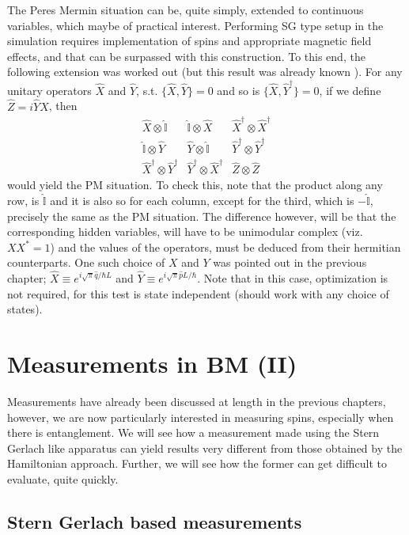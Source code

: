 The Peres Mermin situation can be, quite simply, extended to continuous
variables, which maybe of practical interest. Performing SG type setup
in the simulation requires implementation of spins and appropriate
magnetic field effects, and that can be surpassed with this construction.
To this end, the following extension was worked out (but this result
was already known \cite{contextualityPhaseSpace}). For any unitary
operators $\hat{X}$ and $\hat{Y}$, s.t. $\{\hat{X},\hat{Y}\}=0$
and so is $\{\hat{X},\hat{Y}^{\dagger}\}=0$, if we define $\hat{Z}=i\hat{Y}\hat{X}$,
then 
\[
\begin{array}{ccc}
\hat{X}\otimes\hat{\mathbb{I}} & \hat{\mathbb{I}}\otimes\hat{X} & \hat{X}^{\dagger}\otimes\hat{X}^{\dagger}\\
\hat{\mathbb{I}}\otimes\hat{Y} & \hat{Y}\otimes\hat{\mathbb{I}} & \hat{Y}^{\dagger}\otimes\hat{Y}^{\dagger}\\
\hat{X}^{\dagger}\otimes\hat{Y}^{\dagger} & \hat{Y}^{\dagger}\otimes\hat{X}^{\dagger} & \hat{Z}\otimes\hat{Z}
\end{array}
\]
would yield the PM situation. To check this, note that the product
along any row, is $\hat{\mathbb{I}}$ and it is also so for each column,
except for the third, which is $-\hat{\mathbb{I}}$, precisely the
same as the PM situation. The difference however, will be that the
corresponding hidden variables, will have to be unimodular complex
(viz. $XX^{*}=1$) and the values of the operators, must be deduced
from their hermitian counterparts. One such choice of $X$ and $Y$
was pointed out in the previous chapter; $\hat{X}\equiv e^{i\sqrt{\pi}\hat{q}/\hbar L}$
and $\hat{Y}\equiv e^{i\sqrt{\pi}\hat{p}L/\hbar}$. Note that in this
case, optimization is not required, for this test is state independent
(should work with any choice of states).


\section{Measurements in BM (II)}

Measurements have already been discussed at length in the previous
chapters, however, we are now particularly interested in measuring
spins, especially when there is entanglement. We will see how a measurement
made using the Stern Gerlach like apparatus can yield results very
different from those obtained by the Hamiltonian approach. Further,
we will see how the former can get difficult to evaluate, quite quickly.


\subsection{Stern Gerlach based measurements \label{sub:BM-entangled-Stern-Gerlach}}

